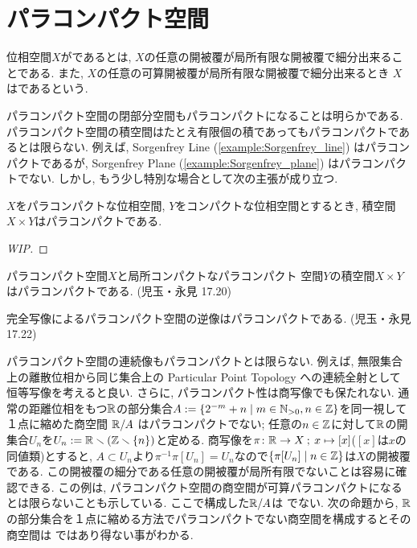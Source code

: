 \documentclass[uplatex, dvipdfmx, a4paper, 12pt, class=jsbook, crop=false]{standalone}
\begin{document}
\section{パラコンパクト空間}
\label{sec:paracompact-spaces}

\newcommand{\starset}[2]{\mathrm{St}\left(#1 , \: #2\right)}
\newcommand{\sstarset}[3]{\mathrm{St}^{#1}\left(#2 , \: #3 \right)}

\begin{definition}
	位相空間$ X $がであるとは, 
	$ X $の任意の開被覆が局所有限な開被覆で細分出来ることである. 
	また, $ X $の任意の可算開被覆が局所有限な開被覆で細分出来るとき
	$ X $はであるという.
\end{definition}

パラコンパクト空間の閉部分空間もパラコンパクトになることは明らかである. 
パラコンパクト空間の積空間はたとえ有限個の積であってもパラコンパクトであるとは限らない. 
例えば, Sorgenfrey Line (\ref{example:Sorgenfrey_line}) はパラコンパクトであるが, 
Sorgenfrey Plane (\ref{example:Sorgenfrey_plane}) はパラコンパクトでない. 
しかし, もう少し特別な場合として次の主張が成り立つ.

\begin{proposition}
	$ X $をパラコンパクトな位相空間, $ Y $をコンパクトな位相空間とするとき, 積空間$ X \times Y $はパラコンパクトである.
\end{proposition}
\begin{proof}
	[WIP]
\end{proof}

\begin{proposition}
	パラコンパクト空間$ X $と局所コンパクトなパラコンパクト  空間$ Y $の積空間$ X \times Y $はパラコンパクトである.
	(児玉・永見 17.20)
\end{proposition}

\begin{proposition}
	完全写像によるパラコンパクト空間の逆像はパラコンパクトである.
	(児玉・永見 17.22)
\end{proposition}

パラコンパクト空間の連続像もパラコンパクトとは限らない. 
例えば, 無限集合上の離散位相から同じ集合上の Particular Point Topology への連続全射として恒等写像を考えると良い. 
さらに, パラコンパクト性は商写像でも保たれない. 
通常の距離位相をもつ$ \mathbb{R} $の部分集合$ A \defeq \setcomp{2^{-m}+n}{m \in \N_{>0}, n \in \Z} $を同一視して１点に縮めた商空間
$ \mathbb{R} / A $ はパラコンパクトでない; 任意の$ n \in \mathbb{Z} $に対して$ \mathbb{R} $の開集合$ U_n $を$ U_n \mathrel{:=} \mathbb{R} \smallsetminus (\mathbb{Z} \smallsetminus \{n\}) $と定める. 
商写像を$ \pi \colon \mathbb{R} \to X \mathpunct{\: ; \:} x \mapsto [x] $($ [x] $は$ x $の同値類)とすると, 
$ A \subset U_n $より$ \pi^{-1}\pi[U_n] = U_n $なので$ \setcomp{\pi[U_n]}{n \in \Z} $は$ X $の開被覆である. 
この開被覆の細分である任意の開被覆が局所有限でないことは容易に確認できる. 
この例は, パラコンパクト空間の商空間が可算パラコンパクトになるとは限らないことも示している. 
ここで構成した$ \mathbb{R} / A $は  でない. 
次の命題から, $ \mathbb{R} $の部分集合を１点に縮める方法でパラコンパクトでない商空間を構成するとその商空間は  ではあり得ない事がわかる.
\end{document}
